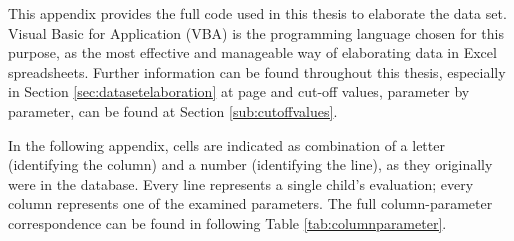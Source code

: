 \label{chap:appendixvbaexpressions}
This appendix provides the full code used in this thesis to elaborate the data set. Visual Basic for Application (VBA) is the programming language chosen for this purpose, as the most effective and manageable way of elaborating data in Excel spreadsheets. Further information can be found throughout this thesis, especially in Section \ref{sec:datasetelaboration} at page \pageref{sec:datasetelaboration} and cut-off values, parameter by parameter, can be found at Section \ref{sub:cutoffvalues}.

In the following appendix, cells are indicated as combination of a letter (identifying the column) and a number (identifying the line), as they originally were in the database. Every line represents a single child's evaluation; every column represents one of the examined parameters. The full column-parameter correspondence can be found in following Table \ref{tab:columnparameter}.


